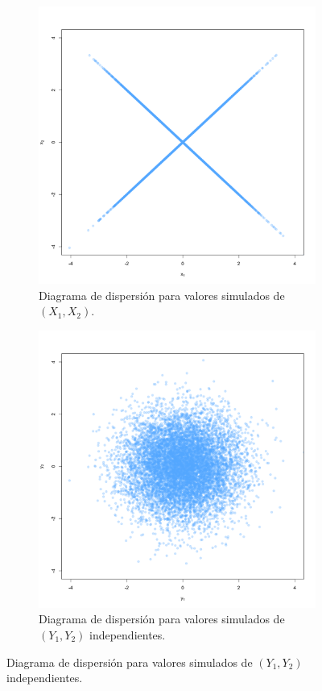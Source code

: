 \documentclass[11pt,a4paper]{article}
\begin{document}
\begin{figure}
    \centering
    \begin{subfigure}[t]{0.45\textwidth}
        \centering
        \includegraphics[width=\linewidth]{correlation.png} 
        \caption{Diagrama de dispersión para valores simulados de $(X_1, X_2)$.} \label{fig:corr1}
    \end{subfigure}
    \hfill
    \begin{subfigure}[t]{0.45\textwidth}
        \centering
        \includegraphics[width=\linewidth]{correlation_ind.png} 
        \caption{Diagrama de dispersión para valores simulados de $(Y_1, Y_2)$ independientes.} \label{fig:corr2}
    \end{subfigure}
    

\end{figure}
\end{document}
